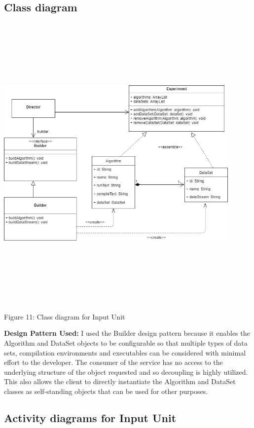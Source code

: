 \subsection{Class diagram}
	\includegraphics[width=12cm,height=15cm,keepaspectratio]{input_unit/images/input_unit_class_diagram.png}
	\begin{center}
	    \small{Figure 11: Class diagram for Input Unit}
    \end{center}
 \begin{flushleft}
\par\textbf{Design Pattern Used: }
	I used the Builder design pattern because it enables the Algorithm and DataSet objects to be configurable so that multiple types of data sets, compilation environments and executables can be considered with minimal effort to the developer. The consumer of the service has no access to the underlying structure of the object requested and so decoupling is highly utilized. This also allows the client to directly instantiate the Algorithm and DataSet classes as self-standing objects that can be used for other purposes.
    \end{flushleft}
	\newpage
\subsection{Activity diagrams for Input Unit}
